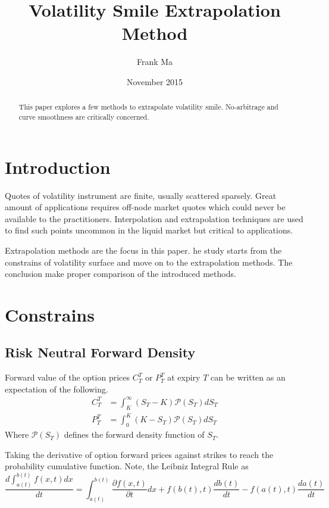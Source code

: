 \documentclass{article}
\title{Volatility Smile Extrapolation Method}
\author{Frank Ma}
\date{November 2015}
\begin{document}
\maketitle

\begin{abstract}
    This paper explores a few methods to extrapolate volatility smile.
    No-arbitrage and curve smoothness are critically concerned.
\end{abstract}


\section{Introduction}

Quotes of volatility instrument are finite, usually scattered sparsely.
Great amount of applications requires off-node market quotes which could never be available to the practitioners.
Interpolation and extrapolation techniques are used to find such points uncommon in the liquid market but critical to applications. 

Extrapolation methods are the focus in this paper. 
he study starts from the constrains of volatility surface and move on to the extrapolation methods.
The conclusion make proper comparison of the introduced methods.


\section{Constrains}

\subsection{Risk Neutral Forward Density}
Forward value of the option prices $ C_T^T $ or $ P_T^T $ at expiry $ T $ can be written as an expectation of the following.
\begin{subequations}
    \begin{align}
        C_T^T &= \int_{K}^{\infty}{(S_T - K) \mathcal{P}\left(S_T\right)} d S_T \\
        P_T^T &= \int_{0}^{K}{(K - S_T) \mathcal{P}\left(S_T\right)} d S_T
    \end{align}
\end{subequations}
Where $ \mathcal{P}(S_T) $ defines the forward density function of $ S_T $.

Taking the derivative of option forward prices against strikes to reach the probability cumulative function.
Note, the Leibniz Integral Rule as
\begin{equation}
    \frac{d \int_{a(t)}^{b(t)}{f(x, t)} d x}{d t} = \int_{a(t)}^{b(t)}{\frac{\partial f(x, t)}{\partial t} d x} + f\left(b(t), t\right) \frac{d b(t)}{d t} - f\left(a(t), t\right) \frac{d a(t)}{d t}
\end{equation}
\end{document}
